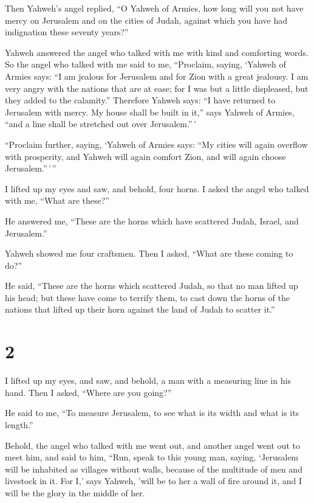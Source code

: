  Then Yahweh's angel replied, ``O Yahweh of Armies, how
long will you not have mercy on Jerusalem and on the cities of Judah,
against which you have had indignation these seventy years?''

 Yahweh answered the angel who talked with me with kind
and comforting words.  So the angel who talked with me
said to me, ``Proclaim, saying, `Yahweh of Armies says: ``I am jealous
for Jerusalem and for Zion with a great jealousy.  I am
very angry with the nations that are at ease; for I was but a little
displeased, but they added to the calamity.''  Therefore
Yahweh says: ``I have returned to Jerusalem with mercy. My house shall
be built in it,'' says Yahweh of Armies, ``and a line shall be stretched
out over Jerusalem.''\,'

 ``Proclaim further, saying, `Yahweh of Armies says: ``My
cities will again overflow with prosperity, and Yahweh will again
comfort Zion, and will again choose Jerusalem.''\,'\,''

 I lifted up my eyes and saw, and behold, four horns.
 I asked the angel who talked with me, ``What are
these?''

He answered me, ``These are the horns which have scattered Judah,
Israel, and Jerusalem.''

 Yahweh showed me four craftsmen.  Then I
asked, ``What are these coming to do?''

He said, ``These are the horns which scattered Judah, so that no man
lifted up his head; but these have come to terrify them, to cast down
the horns of the nations that lifted up their horn against the land of
Judah to scatter it.''

\hypertarget{section-1}{%
\section{2}\label{section-1}}

 I lifted up my eyes, and saw, and behold, a man with a
measuring line in his hand.  Then I asked, ``Where are you
going?''

He said to me, ``To measure Jerusalem, to see what is its width and what
is its length.''

 Behold, the angel who talked with me went out, and
another angel went out to meet him,  and said to him,
``Run, speak to this young man, saying, `Jerusalem will be inhabited as
villages without walls, because of the multitude of men and livestock in
it.  For I,' says Yahweh, 'will be to her a wall of fire
around it, and I will be the glory in the middle of her.

